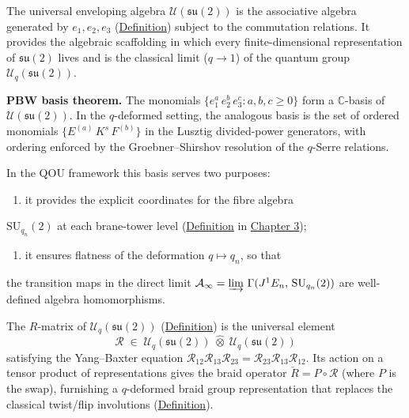 \begin{remark}
  \label{rem:enveloping-algebra}
The universal enveloping algebra
$\mathcal{U}(\mathfrak{su}(2))$ is the associative algebra generated by
$e_1,e_2,e_3$ (\hyperref[def:su2-basis]{Definition}) subject to the
commutation relations.  It provides the
algebraic scaffolding in which every finite-dimensional representation of
$\mathfrak{su}(2)$ lives and is the classical limit ($q\to 1$) of the
quantum group $\mathcal{U}_q(\mathfrak{su}(2))$.

\textbf{PBW basis theorem.}
The monomials $\{e_1^{a}\,e_2^{b}\,e_3^{c} : a,b,c \geq 0\}$ form a
$\mathbb{C}$-basis of
$\mathcal{U}(\mathfrak{su}(2))$.
In the $q$-deformed setting, the analogous basis is the set of ordered
monomials $\{E^{(a)}\,K^{s}\,F^{(b)}\}$ in the Lusztig divided-power
generators, with ordering enforced by the
Groebner--Shirshov resolution of the $q$-Serre
relations.

In the QOU framework this basis serves two purposes:

\begin{enumerate}
  \item it provides the explicit coordinates for the fibre algebra
\end{enumerate}
   $\mathrm{SU}_{q_n}(2)$ at each brane-tower level
   (\hyperref[def:direct-limit-algebra]{Definition} in
   \hyperref[chap:torsion]{Chapter 3});
\begin{enumerate}
  \item it ensures flatness of the deformation $q \mapsto q_n$, so that
\end{enumerate}
   the transition maps in the direct limit
   $\mathcal{A}_\infty = \varinjlim\,\Gamma(J^1 E_n,\,
   \mathrm{SU}_{q_n}(2))$ are well-defined algebra homomorphisms.
\end{remark}

\begin{remark}
  \label{rem:r-matrix-braiding}
The $R$-matrix of $\mathcal{U}_q(\mathfrak{su}(2))$
(\hyperref[def:quantum-su2]{Definition}) is the universal element
\[
\mathcal{R}\;\in\;
  \mathcal{U}_q(\mathfrak{su}(2))\;\hat{\otimes}\;
  \mathcal{U}_q(\mathfrak{su}(2))
\]
satisfying the Yang--Baxter equation
$\mathcal{R}_{12}\mathcal{R}_{13}\mathcal{R}_{23}
=\mathcal{R}_{23}\mathcal{R}_{13}\mathcal{R}_{12}$.
Its action on a tensor product of representations gives the braid
operator $\check{R}=P\circ\mathcal{R}$ (where $P$ is the swap),
furnishing a $q$-deformed braid group representation that replaces
the classical twist/flip involutions
(\hyperref[def:braid-twist-flip]{Definition}).
\end{remark}

